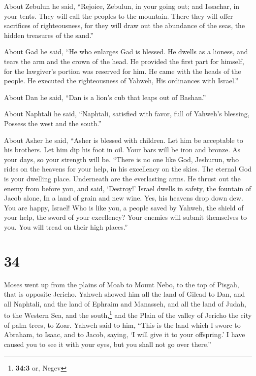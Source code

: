  About Zebulun he said, ``Rejoice, Zebulun, in your going
out; and Issachar, in your tents.  They will call the
peoples to the mountain. There they will offer sacrifices of
righteousness, for they will draw out the abundance of the seas, the
hidden treasures of the sand.''

 About Gad he said, ``He who enlarges Gad is blessed. He
dwells as a lioness, and tears the arm and the crown of the head.
 He provided the first part for himself, for the
lawgiver's portion was reserved for him. He came with the heads of the
people. He executed the righteousness of Yahweh, His ordinances with
Israel.''

 About Dan he said, ``Dan is a lion's cub that leaps out
of Bashan.''

 About Naphtali he said, ``Naphtali, satisfied with
favor, full of Yahweh's blessing, Possess the west and the south.''

 About Asher he said, ``Asher is blessed with children.
Let him be acceptable to his brothers. Let him dip his foot in oil.
 Your bars will be iron and bronze. As your days, so your
strength will be.  ``There is no one like God, Jeshurun,
who rides on the heavens for your help, in his excellency on the skies.
 The eternal God is your dwelling place. Underneath are
the everlasting arms. He thrust out the enemy from before you, and said,
`Destroy!'  Israel dwells in safety, the fountain of
Jacob alone, In a land of grain and new wine. Yes, his heavens drop down
dew.  You are happy, Israel! Who is like you, a people
saved by Yahweh, the shield of your help, the sword of your excellency?
Your enemies will submit themselves to you. You will tread on their high
places.''

\hypertarget{section-33}{%
\section{34}\label{section-33}}

 Moses went up from the plains of Moab to Mount Nebo, to
the top of Pisgah, that is opposite Jericho. Yahweh showed him all the
land of Gilead to Dan,  and all Naphtali, and the land of
Ephraim and Manasseh, and all the land of Judah, to the Western Sea,
 and the south,\footnote{\textbf{34:3} or, Negev} and the
Plain of the valley of Jericho the city of palm trees, to Zoar.
 Yahweh said to him, ``This is the land which I swore to
Abraham, to Isaac, and to Jacob, saying, `I will give it to your
offspring.' I have caused you to see it with your eyes, but you shall
not go over there.''

